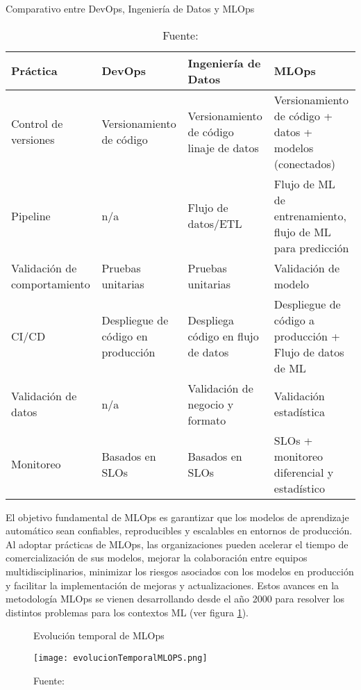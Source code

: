 \begin{table}[h]
\centering
\caption{Comparativo entre DevOps, Ingeniería de Datos y MLOps}
\label{tab:practicas}
\begin{tabular}{|p{3cm}|p{3cm}|p{3cm}|p{4cm}|}
\hline
\textbf{Práctica} & \textbf{DevOps} & \textbf{Ingeniería de Datos} & \textbf{MLOps} \\
\hline
Control de versiones & Versionamiento de código & Versionamiento de código linaje de datos & Versionamiento de código + datos + modelos (conectados) \\
\hline
Pipeline & n/a & Flujo de datos/ETL & Flujo de ML de entrenamiento, flujo de ML para predicción \\
\hline
Validación de comportamiento & Pruebas unitarias & Pruebas unitarias & Validación de modelo \\
\hline
CI/CD & Despliegue de código en producción & Despliega código en flujo de datos & Despliegue de código a producción + Flujo de datos de ML \\
\hline
Validación de datos & n/a & Validación de negocio y formato & Validación estadística \\
\hline
Monitoreo & Basados en SLOs & Basados en SLOs & SLOs + monitoreo diferencial y estadístico \\
\hline
\end{tabular}
\caption*{\footnotesize Fuente: \citet{rivero2022}}
\end{table}

\newpage

El objetivo fundamental de MLOps es garantizar que los modelos de aprendizaje automático sean confiables, reproducibles y escalables en entornos de producción. Al adoptar prácticas de MLOps, las organizaciones pueden acelerar el tiempo de comercialización de sus modelos, mejorar la colaboración entre equipos multidisciplinarios, minimizar los riesgos asociados con los modelos en producción y facilitar la implementación de mejoras y actualizaciones. Estos avances en la metodología MLOps se vienen desarrollando desde el año 2000 para resolver los distintos problemas para los contextos ML (ver figura \ref{fig:figura2}).\\


\begin{figure}[h]
\caption{Evolución temporal de MLOps}
\centering
\texttt{[image: evolucionTemporalMLOPS.png]}
\label{fig:figura2}
\caption*{\footnotesize Fuente: \citet{visengeriyeva2020}}
\end{figure}


